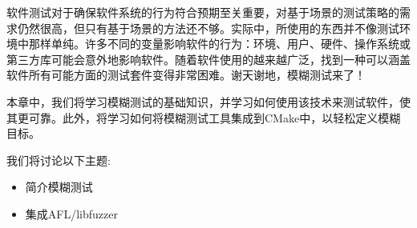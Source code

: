 软件测试对于确保软件系统的行为符合预期至关重要，对基于场景的测试策略的需求仍然很高，但只有基于场景的方法还不够。实际中，所使用的东西并不像测试环境中那样单纯。许多不同的变量影响软件的行为：环境、用户、硬件、操作系统或第三方库可能会意外地影响软件。随着软件使用的越来越广泛，找到一种可以涵盖软件所有可能方面的测试套件变得非常困难。谢天谢地，模糊测试来了！

本章中，我们将学习模糊测试的基础知识，并学习如何使用该技术来测试软件，使其更可靠。此外，将学习如何将模糊测试工具集成到CMake中，以轻松定义模糊目标。

我们将讨论以下主题:

\begin{itemize}
\item 
简介模糊测试

\item 
集成AFL/libfuzzer
\end{itemize}
























